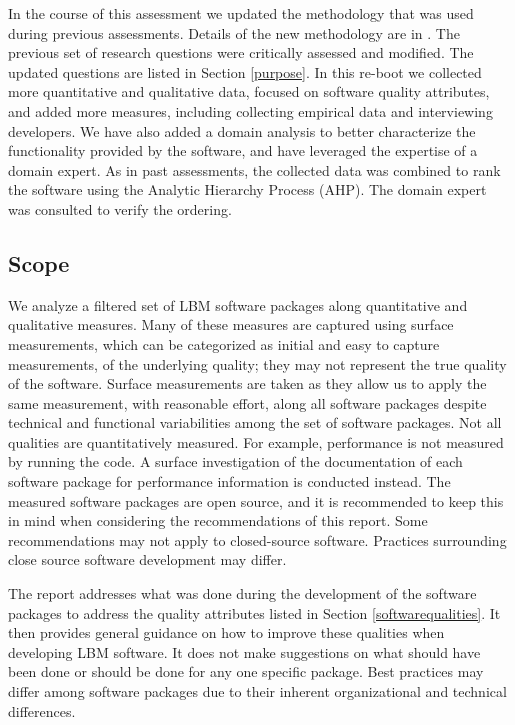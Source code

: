 \documentclass[12pt, notitlepage]{article}
\begin{document}
In the course of this assessment we updated the methodology that was used during previous assessments. Details of the new methodology are in \citep{methodology2020}. The previous set of research questions were critically assessed and modified. The updated questions are listed in Section \ref{purpose}. In this re-boot we collected more quantitative and qualitative data, focused on software quality attributes, and added more measures, including collecting empirical data and interviewing developers. We have also added a domain analysis to better characterize the functionality provided by the software, and have leveraged the expertise of a domain expert. As in past assessments, the collected data was combined to rank the software using the Analytic Hierarchy Process (AHP). The domain expert was consulted to verify the ordering.

\subsection{Scope}

We analyze a filtered set of LBM software packages along quantitative and qualitative measures. Many of these measures are captured using surface measurements, which can be categorized as initial and easy to capture measurements, of the underlying quality; they may not represent the true quality of the software. Surface measurements are taken as they allow us to apply the same measurement, with reasonable effort, along all software packages despite technical and functional variabilities among the set of software packages. Not all qualities are quantitatively measured. For example, performance is not measured by running the code. A surface investigation of the documentation of each software package for performance information is conducted instead. The measured software packages are open source, and it is recommended to keep this in mind when considering the recommendations of this report. Some recommendations may not apply to closed-source software. Practices surrounding close source software development may differ.

The report addresses what was done during the development of the software packages to address the quality attributes listed in Section \ref{softwarequalities}. It then provides general guidance on how to improve these qualities when developing LBM software. It does not make suggestions on what should have been done or should be done for any one specific package. Best practices may differ among software packages due to their inherent organizational and technical differences. 
\end{document}
